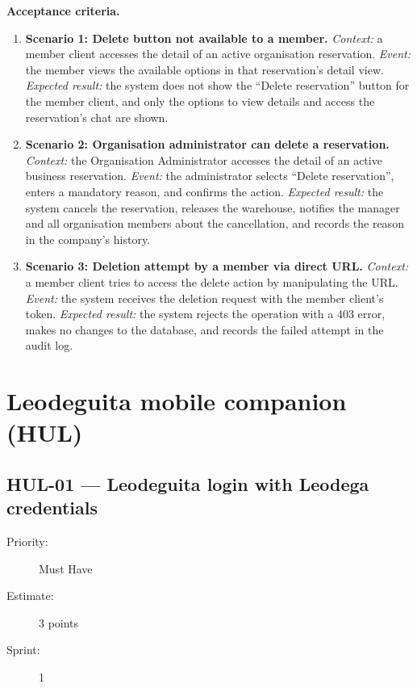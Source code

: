 \documentclass[11pt,a4paper,oneside]{report}
\begin{document}
\textbf{Acceptance criteria.}
\begin{enumerate}
\item \textbf{Scenario 1: Delete button not available to a member.} \emph{Context:} a member client accesses the detail of an active organisation reservation. \emph{Event:} the member views the available options in that reservation's detail view. \emph{Expected result:} the system does not show the ``Delete reservation'' button for the member client, and only the options to view details and access the reservation's chat are shown.
\item \textbf{Scenario 2: Organisation administrator can delete a reservation.} \emph{Context:} the Organisation Administrator accesses the detail of an active business reservation. \emph{Event:} the administrator selects ``Delete reservation'', enters a mandatory reason, and confirms the action. \emph{Expected result:} the system cancels the reservation, releases the warehouse, notifies the manager and all organisation members about the cancellation, and records the reason in the company's history.
\item \textbf{Scenario 3: Deletion attempt by a member via direct URL.} \emph{Context:} a member client tries to access the delete action by manipulating the URL. \emph{Event:} the system receives the deletion request with the member client's token. \emph{Expected result:} the system rejects the operation with a 403 error, makes no changes to the database, and records the failed attempt in the audit log.
\end{enumerate}

\section{Leodeguita mobile companion (HUL)}

\subsection{HUL-01 --- Leodeguita login with Leodega credentials}
\label{req:HUL-01}
\begin{description}
\item[Priority:] Must Have \quad \item[Estimate:] 3 points \quad \item[Sprint:] 1
\end{description}
\end{document}
